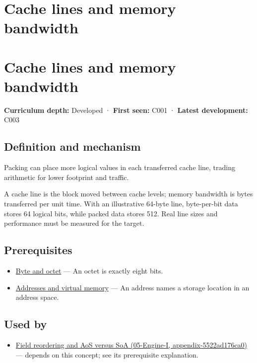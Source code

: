 \hypertarget{appendix-e4ccdbab8320}{}
\section*{Cache lines and memory bandwidth}
\section{Cache lines and memory bandwidth}\label{appendix-e4ccdbab8320-cache-lines-and-memory-bandwidth}

\textbf{Curriculum depth:} Developed · \textbf{First seen:} C001 · \textbf{Latest development:} C003

\subsection{Definition and mechanism}\label{appendix-e4ccdbab8320-definition-and-mechanism}

Packing can place more logical values in each transferred cache line, trading arithmetic for lower footprint and traffic.

A cache line is the block moved between cache levels; memory bandwidth is bytes transferred per unit time. With an illustrative 64-byte line, byte-per-bit data stores 64 logical bits, while packed data stores 512. Real line sizes and performance must be measured for the target.

\subsection{Prerequisites}\label{appendix-e4ccdbab8320-prerequisites}

\begin{itemize}
\tightlist
\item
  \hyperref[appendix-5bee2df85484]{Byte and octet} --- An octet is exactly eight bits.
\item
  \hyperref[appendix-18ee4f913c3c]{Addresses and virtual memory} --- An address names a storage location in an address space.
\end{itemize}

\subsection{Used by}\label{appendix-e4ccdbab8320-used-by}

\begin{itemize}
\tightlist
\item
  \href{../05-Engine-I/main.pdf\#nameddest=appendix-5522ad176ca0}{Field reordering and AoS versus SoA (05-Engine-I, appendix-5522ad176ca0)} --- depends on this concept; see its prerequisite explanation.
\end{itemize}

